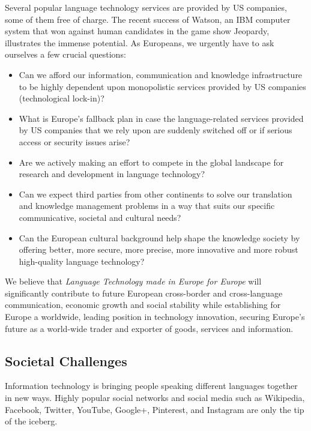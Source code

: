 \documentclass[10pt, plain]{../../metanetpaper}
\begin{document}
\begin{multicols}{2}
Several popular language technology services are provided by US companies, some of them free of charge. The recent success of Watson, an IBM computer system that won against human candidates in the game show Jeopardy, illustrates the immense potential. As Europeans, we urgently have to ask ourselves a few crucial questions:

\begin{itemize}
\item Can we afford our information, communication and knowledge infrastructure to be highly dependent upon monopolistic services provided by US companies (technological lock-in)?
\item What is Europe's fallback plan in case the language-related services provided by US companies that we rely upon are suddenly switched off or if serious access or security issues arise?
\item Are we actively making an effort to compete in the global landscape for research and development in language technology?
\item Can we expect third parties from other continents to solve our translation and knowledge management problems in a way that suits our specific communicative, societal and cultural needs?
\item Can the European cultural background help shape the knowledge society by offering better, more secure, more precise, more innovative and more robust high-quality language technology?
\end{itemize}

We believe that \emph{Language Technology made in Europe for Europe} will significantly contribute to future European cross-border and cross-language communication, economic growth \cite{economist12} and social stability while establishing for Europe a worldwide, leading position in technology innovation, securing Europe's future as a world-wide trader and exporter of goods, services and information.

\subsection{Societal Challenges}
\label{sec:what-soci-challenges}

Information technology is bringing people speaking different languages together in new ways. Highly popular social networks and social media such as Wikipedia, Facebook, Twitter, YouTube, Google+, Pinterest, and Instagram are only the tip of the iceberg.


\end{multicols}
\end{document}
